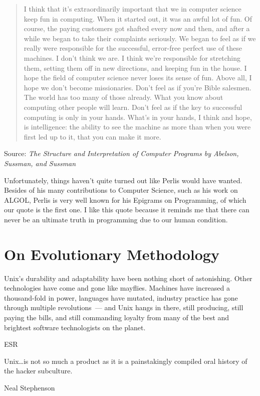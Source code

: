 \documentclass{book}
\begin{document}
\begin{quote}
I think that it's extraordinarily important that we in computer
science keep fun in computing. When it started out, it was an awful
lot of fun. Of course, the paying customers got shafted every now and
then, and after a while we began to take their complaints
seriously. We began to feel as if we really were responsible for the
successful, error-free perfect use of these machines. I don't think we
are. I think we're responsible for stretching them, setting them off
in new directions, and keeping fun in the house. I hope the field of
computer science never loses its sense of fun. Above all, I hope we
don't become missionaries. Don't feel as if you're Bible salesmen. The
world has too many of those already. What you know about computing
other people will learn. Don't feel as if the key to successful
computing is only in your hands. What's in your hands, I think and
hope, is intelligence: the ability to see the machine as more than
when you were first led up to it, that you can make it more.
\end{quote}

\begin{flushright}
  Source: \emph{The Structure and Interpretation of Computer
    Programs by Abelson, Sussman, and Sussman}
\end{flushright}

Unfortunately, things haven't quite turned out like Perlis would have
wanted. Besides of his many contributions to Computer Science, such as
his work on ALGOL, Perlis is very well known for his Epigrams on
Programming, of which our quote is the first one. I like this quote
because it reminds me that there can never be an ultimate truth in
programming due to our human condition.

\chapter{On Evolutionary Methodology}

\epigraph{Unix's durability and adaptability have been nothing short of
  astonishing. Other technologies have come and gone like
  mayflies. Machines have increased a thousand-fold in power,
  languages have mutated, industry practice has gone through multiple
  revolutions~--- and Unix hangs in there, still producing, still paying
  the bills, and still commanding loyalty from many of the best and
  brightest software technologists on the planet.}{ESR}

\epigraph{Unix\ldots is not so much a product as it is a painstakingly
  compiled oral history of the hacker subculture.}{Neal Stephenson}
\end{document}
